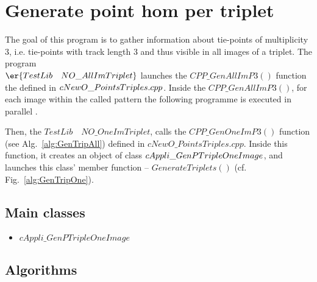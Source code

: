 \section{Generate point hom per triplet }
%
The goal of this program is to gather information about tie-points of multiplicity 3, i.e. tie-points with track length 3 and thus visible in all images of a triplet. The program \\$\er{TestLib \quad NO\_AllImTriplet}$ launches the $CPP\_GenAllImP3()$ function the defined in $cNewO\_\-PointsTriples.cpp$. Inside the $CPP\_GenAllImP3()$, for each image within the called pattern the following programme is executed in parallel .\par 
%
Then, the $TestLib \quad NO\_OneImTriplet$, calls the $CPP\_GenOneImP3()$ function (see Alg.~\ref{alg:GenTripAll}) defined in $cNewO\_PointsTriples.cpp$. Inside this function, it creates an object of class $cAppli\_Gen\-PTripleOneImage$, and launches this class' member function -- $GenerateTriplets()$ (cf. Fig.~\ref{alg:GenTripOne}).
%
\subsection{Main classes}
\begin{itemize}
\item $cAppli\_GenPTripleOneImage$
\end{itemize}
\subsection{Algorithms}

